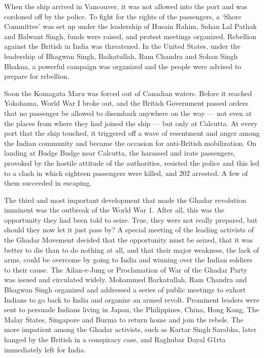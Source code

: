 When the ship arrived in Vancouver, it was not allowed into the port and was cordoned off by the police. To fight for the rights of the passengers, a `Shore Committee' was set up under the leadership of Husain Rahim, Sohan Lal Pathak and Balwant Singh, funds were raised, and protest meetings organized. Rebellion against the British in India was threatened. In the United States, under the leadership of Bhagwan Singh, Baikatullah, Ram Chandra and Sohan Singh Bhakna, a powerful campaign was organized and the people were advised to prepare for rebellion.

Soon the Komagata Maru was forced out of Canadian waters. Before it reached Yokohama, World War I broke out, and the British Government passed orders that no passenger be allowed to disembark anywhere on the way --- not even at the places from where they had joined the ship --- but only at Calcutta. At every port that the ship touched, it triggered off a wave of resentment and anger among the Indian community and became the occasion for anti-British mobilization. On landing at Budge Budge near Calcutta, the harassed and irate passengers, provoked by the hostile attitude of the authorities, resisted the police and this led to a clash in which eighteen passengers were killed, and 202 arrested. A few of them succeeded in escaping.

The third and most important development that made the Ghadar revolution imminent was the outbreak of the World War 1. After all, this was the opportunity they had been told to seize. True, they were not really prepared, but should they now let it just pass by? A special meeting of the leading activists of the Ghadar Movement decided that the opportunity must be seized, that it was better to die than to do nothing at all, and that their major weakness, the lack of arms, could be overcome by going to India and winning over the Indian soldiers to their cause. The Ailan-e-Jung or Proclamation of War of the Ghadar Party was issued and circulated widely. Mohammed Barkatullah, Ram Chandra and Bhagwan Singh organized and addressed a series of public meetings to exhort Indians to go back to India and organize an armed revolt. Prominent leaders were sent to persuade Indians living in Japan, the Philippines, China, Hong Kong, The Malay States, Singapore and Burma to return home and join the rebels. The more impatient among the Ghadar activists, such as Kartar Singh Sarabha, later hanged by the British in a conspiracy case, and Raghubar Dayal G1rta immediately left for India.

